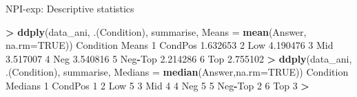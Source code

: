 \documentclass[ignorenonframetext,]{beamer}
\newenvironment{Shaded}{\begin{snugshade}}{\end{snugshade}}
\newcommand{\KeywordTok}[1]{\textcolor[rgb]{0.13,0.29,0.53}{\textbf{#1}}}
\newcommand{\DataTypeTok}[1]{\textcolor[rgb]{0.13,0.29,0.53}{#1}}
\newcommand{\DecValTok}[1]{\textcolor[rgb]{0.00,0.00,0.81}{#1}}
\newcommand{\FloatTok}[1]{\textcolor[rgb]{0.00,0.00,0.81}{#1}}
\newcommand{\StringTok}[1]{\textcolor[rgb]{0.31,0.60,0.02}{#1}}
\newcommand{\OtherTok}[1]{\textcolor[rgb]{0.56,0.35,0.01}{#1}}
\newcommand{\OperatorTok}[1]{\textcolor[rgb]{0.81,0.36,0.00}{\textbf{#1}}}
\newcommand{\NormalTok}[1]{#1}
\begin{document}
\begin{frame}[fragile]{NPI-exp: Descriptive statistics}

\tiny 

\begin{Shaded}
\begin{Highlighting}[]
\OperatorTok{>}\StringTok{ }\KeywordTok{ddply}\NormalTok{(data_ani, .(Condition), summarise, }\DataTypeTok{Means =} \KeywordTok{mean}\NormalTok{(Answer, }\DataTypeTok{na.rm=}\OtherTok{TRUE}\NormalTok{))}
\NormalTok{  Condition    Means}
\DecValTok{1}\NormalTok{   CondPos }\FloatTok{1.632653}
\DecValTok{2}\NormalTok{       Low }\FloatTok{4.190476}
\DecValTok{3}\NormalTok{       Mid }\FloatTok{3.517007}
\DecValTok{4}\NormalTok{       Neg }\FloatTok{3.540816}
\DecValTok{5}\NormalTok{   Neg}\OperatorTok{-}\NormalTok{Top }\FloatTok{2.214286}
\DecValTok{6}\NormalTok{       Top }\FloatTok{2.755102}
\OperatorTok{>}\StringTok{ }\KeywordTok{ddply}\NormalTok{(data_ani, .(Condition), summarise, }\DataTypeTok{Medians =} \KeywordTok{median}\NormalTok{(Answer,}\DataTypeTok{na.rm=}\OtherTok{TRUE}\NormalTok{))}
\NormalTok{  Condition Medians}
\DecValTok{1}\NormalTok{   CondPos       }\DecValTok{1}
\DecValTok{2}\NormalTok{       Low       }\DecValTok{5}
\DecValTok{3}\NormalTok{       Mid       }\DecValTok{4}
\DecValTok{4}\NormalTok{       Neg       }\DecValTok{5}
\DecValTok{5}\NormalTok{   Neg}\OperatorTok{-}\NormalTok{Top       }\DecValTok{2}
\DecValTok{6}\NormalTok{       Top       }\DecValTok{3}
\OperatorTok{>}\StringTok{ }
\end{Highlighting}
\end{Shaded}

\end{frame}
\end{document}
